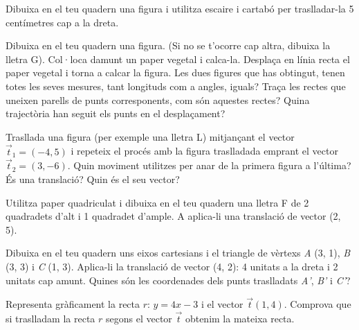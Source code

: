 \begin{mylist}
	
	
	
	
	\exer Dibuixa en el teu quadern una figura i utilitza escaire i cartabó per traslladar-la 5 centímetres cap a la dreta.
	
	\exer  Dibuixa en el teu quadern una figura. (Si no se t'ocorre cap altra, dibuixa la lletra G). Col·loca damunt un paper vegetal i calca-la. Desplaça en línia recta el paper vegetal i torna a calcar la figura. Les dues figures que has obtingut, tenen totes les seves mesures, tant longituds com a angles, iguals? Traça les rectes que uneixen parells de punts corresponents, com són aquestes rectes? Quina trajectòria han seguit els punts en el desplaçament?
	
	
	\exer[1]  Trasllada una figura (per exemple una lletra L) mitjançant el vector \linebreak $\vec t_1= (-4, 5)$ i repeteix el procés amb la figura traslladada emprant el vector  $\vec t_2= (3, -6)$. Quin moviment utilitzes per anar de la primera figura a l'última? És una translació? Quin és el seu vector?
	
	\exer  Utilitza paper quadriculat i dibuixa en el teu quadern una lletra F de 2 quadradets d'alt i 1 quadradet d'ample. A aplica-li una translació de vector (2, 5). 
	
	\exer  Dibuixa en el teu quadern uns eixos cartesians i el triangle de vèrtexs \textit{A} (3, 1), \linebreak \textit{B} (3, 3) i \textit{C} (1, 3). Aplica-li la translació de vector (4, 2): 4 unitats a la dreta i 2 unitats cap amunt. Quines són les coordenades dels punts traslladats \textit{A'}, \textit{B'} i \textit{C'}?
	
	


\exer Representa gràficament la recta $r: \, y=4x-3$ i el vector $\vec t(1,4)$. Comprova que si traslladam la recta $r$ segons el vector $\vec t$ obtenim la mateixa recta. 
 
 	
\end{mylist}
 

